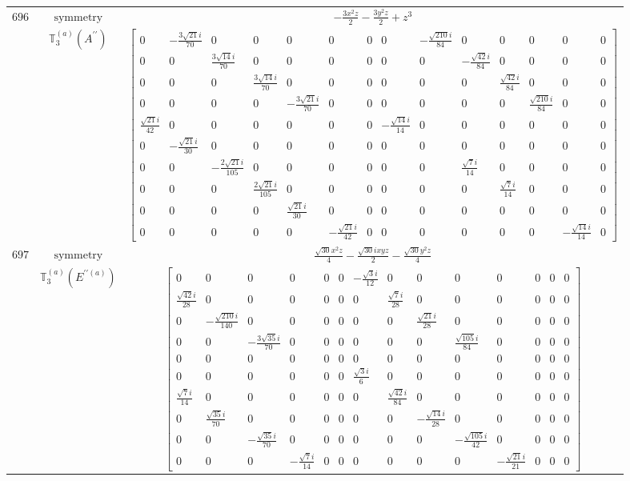 \documentclass[fleqn,8pt,landscape]{jsarticle}
\begin{document}
\begin{longtable}{ccc}
$ 696 $ & $ \text{symmetry} $ & $ - \frac{3 x^{2} z}{2} - \frac{3 y^{2} z}{2} + z^{3} $ \\
$  $ & $ \mathbb{T}_{3}^{(a)}(A^{\prime\prime}) $ & $ \begin{bmatrix} 0 & - \frac{3 \sqrt{21} i}{70} & 0 & 0 & 0 & 0 & 0 & 0 & - \frac{\sqrt{210} i}{84} & 0 & 0 & 0 & 0 & 0 \\ 0 & 0 & \frac{3 \sqrt{14} i}{70} & 0 & 0 & 0 & 0 & 0 & 0 & - \frac{\sqrt{42} i}{84} & 0 & 0 & 0 & 0 \\ 0 & 0 & 0 & \frac{3 \sqrt{14} i}{70} & 0 & 0 & 0 & 0 & 0 & 0 & \frac{\sqrt{42} i}{84} & 0 & 0 & 0 \\ 0 & 0 & 0 & 0 & - \frac{3 \sqrt{21} i}{70} & 0 & 0 & 0 & 0 & 0 & 0 & \frac{\sqrt{210} i}{84} & 0 & 0 \\ \frac{\sqrt{21} i}{42} & 0 & 0 & 0 & 0 & 0 & 0 & - \frac{\sqrt{14} i}{14} & 0 & 0 & 0 & 0 & 0 & 0 \\ 0 & - \frac{\sqrt{21} i}{30} & 0 & 0 & 0 & 0 & 0 & 0 & 0 & 0 & 0 & 0 & 0 & 0 \\ 0 & 0 & - \frac{2 \sqrt{21} i}{105} & 0 & 0 & 0 & 0 & 0 & 0 & \frac{\sqrt{7} i}{14} & 0 & 0 & 0 & 0 \\ 0 & 0 & 0 & \frac{2 \sqrt{21} i}{105} & 0 & 0 & 0 & 0 & 0 & 0 & \frac{\sqrt{7} i}{14} & 0 & 0 & 0 \\ 0 & 0 & 0 & 0 & \frac{\sqrt{21} i}{30} & 0 & 0 & 0 & 0 & 0 & 0 & 0 & 0 & 0 \\ 0 & 0 & 0 & 0 & 0 & - \frac{\sqrt{21} i}{42} & 0 & 0 & 0 & 0 & 0 & 0 & - \frac{\sqrt{14} i}{14} & 0 \end{bmatrix} $ \\ \hline
$ 697 $ & $ \text{symmetry} $ & $ \frac{\sqrt{30} x^{2} z}{4} - \frac{\sqrt{30} i x y z}{2} - \frac{\sqrt{30} y^{2} z}{4} $ \\
$  $ & $ \mathbb{T}_{3}^{(a)}(E^{\prime\prime(a)}) $ & $ \begin{bmatrix} 0 & 0 & 0 & 0 & 0 & 0 & - \frac{\sqrt{3} i}{12} & 0 & 0 & 0 & 0 & 0 & 0 & 0 \\ \frac{\sqrt{42} i}{28} & 0 & 0 & 0 & 0 & 0 & 0 & \frac{\sqrt{7} i}{28} & 0 & 0 & 0 & 0 & 0 & 0 \\ 0 & - \frac{\sqrt{210} i}{140} & 0 & 0 & 0 & 0 & 0 & 0 & \frac{\sqrt{21} i}{28} & 0 & 0 & 0 & 0 & 0 \\ 0 & 0 & - \frac{3 \sqrt{35} i}{70} & 0 & 0 & 0 & 0 & 0 & 0 & \frac{\sqrt{105} i}{84} & 0 & 0 & 0 & 0 \\ 0 & 0 & 0 & 0 & 0 & 0 & 0 & 0 & 0 & 0 & 0 & 0 & 0 & 0 \\ 0 & 0 & 0 & 0 & 0 & 0 & \frac{\sqrt{3} i}{6} & 0 & 0 & 0 & 0 & 0 & 0 & 0 \\ \frac{\sqrt{7} i}{14} & 0 & 0 & 0 & 0 & 0 & 0 & \frac{\sqrt{42} i}{84} & 0 & 0 & 0 & 0 & 0 & 0 \\ 0 & \frac{\sqrt{35} i}{70} & 0 & 0 & 0 & 0 & 0 & 0 & - \frac{\sqrt{14} i}{28} & 0 & 0 & 0 & 0 & 0 \\ 0 & 0 & - \frac{\sqrt{35} i}{70} & 0 & 0 & 0 & 0 & 0 & 0 & - \frac{\sqrt{105} i}{42} & 0 & 0 & 0 & 0 \\ 0 & 0 & 0 & - \frac{\sqrt{7} i}{14} & 0 & 0 & 0 & 0 & 0 & 0 & - \frac{\sqrt{21} i}{21} & 0 & 0 & 0 \end{bmatrix} $ \\ \hline

\end{longtable}
\end{document}
